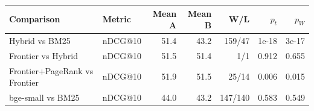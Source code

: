 \begin{tabular}{llrrrrr}
\toprule
Comparison & Metric & Mean A & Mean B & W/L & $p_t$ & $p_W$ \\
\midrule
Hybrid vs BM25 & nDCG@10 & 51.4 & 43.2 & 159/47 & 1e-18 & 3e-17 \\
Frontier vs Hybrid & nDCG@10 & 51.5 & 51.4 & 1/1 & 0.912 & 0.655 \\
Frontier{+}PageRank vs Frontier & nDCG@10 & 51.9 & 51.5 & 25/14 & 0.006 & 0.015 \\
bge-small vs BM25 & nDCG@10 & 44.0 & 43.2 & 147/140 & 0.583 & 0.549 \\
\bottomrule
\end{tabular}
